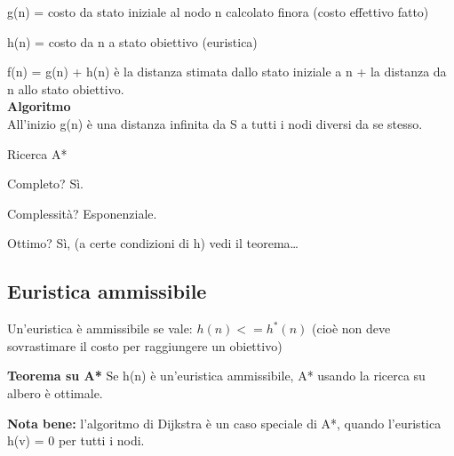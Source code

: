 g(n) = costo da stato iniziale al nodo n calcolato finora (costo effettivo fatto)

h(n) = costo da n a stato obiettivo (euristica)

f(n) = g(n) + h(n) è la distanza stimata dallo stato iniziale a n + la distanza
da n allo stato obiettivo.\\

\textbf{Algoritmo}\\

All'inizio g(n) è una distanza infinita da S a tutti i nodi diversi da se
stesso.

\begin{algorithm}[H]
    \caption{Ricerca A*}
    \label{alg:algA}
    \begin{algorithmic}[1]
            \State{
            \[
             g(n) = 
              \begin{cases} 
               \infty & \text{if } n \neq S \\
               0    & \text{if } n = S
              \end{cases}
            \]}
              \EndIf
            \EndFor
            \EndWhile
    \end{algorithmic}
\end{algorithm}

Completo? Sì.

Complessità? Esponenziale.

Ottimo? Sì, (a certe condizioni di h) vedi il teorema\dots

\subsection{Euristica ammissibile}

Un'euristica è ammissibile se vale: $h(n) <= h^*(n)$
(cioè non deve sovrastimare il costo per raggiungere un obiettivo)

\textbf{Teorema su A*}
Se h(n) è un'euristica ammissibile,  A* usando la ricerca su albero è ottimale.

\textbf{Nota bene:} l'algoritmo di Dijkstra è un caso speciale di A*, quando
l'euristica h(v) = 0 per tutti i nodi.

